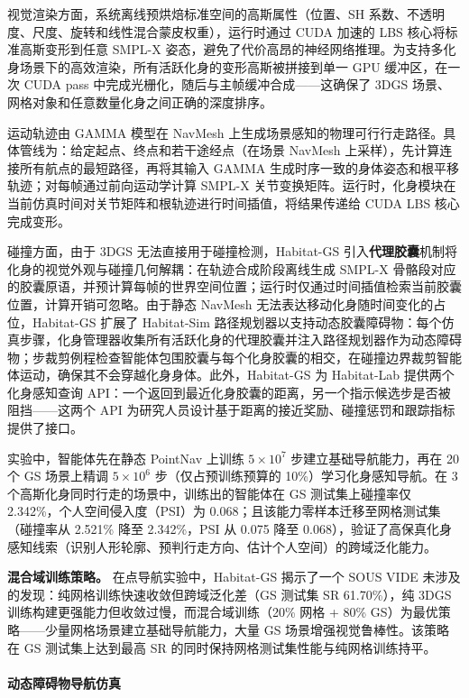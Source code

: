 视觉渲染方面，系统离线预烘焙标准空间的高斯属性（位置、SH 系数、不透明度、尺度、旋转和线性混合蒙皮权重），运行时通过 CUDA 加速的 LBS 核心将标准高斯变形到任意 SMPL-X 姿态，避免了代价高昂的神经网络推理。为支持多化身场景下的高效渲染，所有活跃化身的变形高斯被拼接到单一 GPU 缓冲区，在一次 CUDA pass 中完成光栅化，随后与主帧缓冲合成——这确保了 3DGS 场景、网格对象和任意数量化身之间正确的深度排序。

运动轨迹由 GAMMA 模型在 NavMesh 上生成场景感知的物理可行行走路径。具体管线为：给定起点、终点和若干途经点（在场景 NavMesh 上采样），先计算连接所有航点的最短路径，再将其输入 GAMMA 生成时序一致的身体姿态和根平移轨迹；对每帧通过前向运动学计算 SMPL-X 关节变换矩阵。运行时，化身模块在当前仿真时间对关节矩阵和根轨迹进行时间插值，将结果传递给 CUDA LBS 核心完成变形。

碰撞方面，由于 3DGS 无法直接用于碰撞检测，Habitat-GS 引入\textbf{代理胶囊}机制将化身的视觉外观与碰撞几何解耦：在轨迹合成阶段离线生成 SMPL-X 骨骼段对应的胶囊原语，并预计算每帧的世界空间位置；运行时仅通过时间插值检索当前胶囊位置，计算开销可忽略。由于静态 NavMesh 无法表达移动化身随时间变化的占位，Habitat-GS 扩展了 Habitat-Sim 路径规划器以支持动态胶囊障碍物：每个仿真步骤，化身管理器收集所有活跃化身的代理胶囊并注入路径规划器作为动态障碍物；步裁剪例程检查智能体包围胶囊与每个化身胶囊的相交，在碰撞边界裁剪智能体运动，确保其不会穿越化身身体。此外，Habitat-GS 为 Habitat-Lab 提供两个化身感知查询 API：一个返回到最近化身胶囊的距离，另一个指示候选步是否被阻挡——这两个 API 为研究人员设计基于距离的接近奖励、碰撞惩罚和跟踪指标提供了接口。

实验中，智能体先在静态 PointNav 上训练 $5 \times 10^7$ 步建立基础导航能力，再在 20 个 GS 场景上精调 $5 \times 10^6$ 步（仅占预训练预算的 10\%）学习化身感知导航。在 3 个高斯化身同时行走的场景中，训练出的智能体在 GS 测试集上碰撞率仅 2.342\%，个人空间侵入度（PSI）为 0.068；且该能力零样本迁移至网格测试集（碰撞率从 2.521\% 降至 2.342\%，PSI 从 0.075 降至 0.068），验证了高保真化身感知线索（识别人形轮廓、预判行走方向、估计个人空间）的跨域泛化能力。

\textbf{混合域训练策略。}
在点导航实验中，Habitat-GS 揭示了一个 SOUS VIDE 未涉及的发现：纯网格训练快速收敛但跨域泛化差（GS 测试集 SR 61.70\%），纯 3DGS 训练构建更强能力但收敛过慢，而混合域训练（20\% 网格 + 80\% GS）为最优策略——少量网格场景建立基础导航能力，大量 GS 场景增强视觉鲁棒性。该策略在 GS 测试集上达到最高 SR 的同时保持网格测试集性能与纯网格训练持平。

\paragraph{动态障碍物导航仿真}

